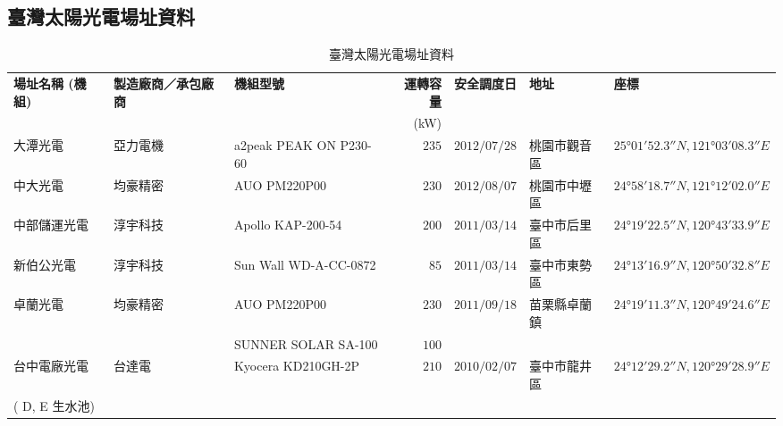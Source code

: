 \newpage

\begin{landscape}
  \section{臺灣太陽光電場址資料}
  \begin{table}[htp]
    \centering
    \caption[臺灣太陽光電場址資料]{臺灣太陽光電場址資料}
    \begin{tabular}{lllrlll}
      \toprule
      \textbf{場址名稱 (機組) } & \textbf{製造廠商／承包廠商} & \textbf{機組型號}      & \textbf{運轉容量} & \textbf{安全調度日} & \textbf{地址} & \textbf{座標}                 \\
                                &                             &                        &  (\si{kW})        &                     &               &                               \\
      \midrule
      大潭光電                  & 亞力電機                    & a2peak PEAK ON P230-60 & $235$             & $2012/07/28$        & 桃園市觀音區  & $25°01'52.3″N, 121°03'08.3″E$ \\
      中大光電                  & 均豪精密                    & AUO PM220P00           & $230$             & $2012/08/07$        & 桃園市中壢區  & $24°58'18.7″N, 121°12'02.0″E$ \\
      中部儲運光電              & 淳宇科技                    & Apollo KAP-200-54      & $200$             & $2011/03/14$        & 臺中市后里區  & $24°19'22.5″N, 120°43'33.9″E$ \\
      新伯公光電                & 淳宇科技                    & Sun Wall WD-A-CC-0872  & $85$              & $2011/03/14$        & 臺中市東勢區  & $24°13'16.9″N, 120°50'32.8″E$ \\
      卓蘭光電                  & 均豪精密                    & AUO PM220P00           & $230$             & $2011/09/18$        & 苗栗縣卓蘭鎮  & $24°19'11.3″N, 120°49'24.6″E$ \\
                                &                             & SUNNER SOLAR SA-100    & $100$             &                     &                                               \\
      台中電廠光電              & 台達電                      & Kyocera KD210GH-2P     & $210$             & $2010/02/07$        & 臺中市龍井區  & $24°12'29.2″N, 120°29'28.9″E$ \\
       ( D, E 生水池)           &                             &                        &                   &                     &                                               \\

\end{tabular}
\end{table}
\end{landscape}
